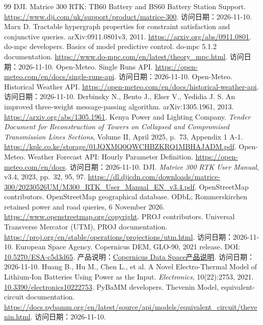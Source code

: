 \begin{thebibliography}{99}
 DJI. Matrice 300 RTK: TB60 Battery and BS60 Battery Station Support. \url{https://www.dji.com/uk/support/product/matrice-300}. 访问日期：2026-11-10.
 Marx D. Tractable hypergraph properties for constraint satisfaction and conjunctive queries. arXiv:0911.0801v3, 2011. \url{https://arxiv.org/abs/0911.0801}.
 do-mpc developers. Basics of model predictive control. do-mpc 5.1.2 documentation. \url{https://www.do-mpc.com/en/latest/theory_mpc.html}. 访问日期：2026-11-10.
 Open-Meteo. Single Runs API. \url{https://open-meteo.com/en/docs/single-runs-api}. 访问日期：2026-11-10.
 Open-Meteo. Historical Weather API. \url{https://open-meteo.com/en/docs/historical-weather-api}. 访问日期：2026-11-10.
 Derbinsky N., Bento J., Elser V., Yedidia J. S. An improved three-weight message-passing algorithm. arXiv:1305.1961, 2013. \url{https://arxiv.org/abs/1305.1961}.
 Kenya Power and Lighting Company. \emph{Tender Document for Reconstruction of Towers on Collapsed and Compromised Transmission Lines Sections}, Volume II, April 2025, p.~73, Appendix 1 A-1. \url{https://kplc.co.ke/storage/01JQXMQ0QWCHBZKRQ1MBHAJADM.pdf}.
 Open-Meteo. Weather Forecast API: Hourly Parameter Definition. \url{https://open-meteo.com/en/docs}. 访问日期：2026-11-10.
 DJI. \emph{Matrice 300 RTK User Manual}, v3.4, 2023, pp.~32, 95, 97. \url{https://dl.djicdn.com/downloads/matrice-300/20230526UM/M300_RTK_User_Manual_EN_v3.4.pdf}.
 OpenStreetMap contributors. OpenStreetMap geographical database. ODbL; Rommerskirchen retained power and road queries, 6 November 2026. \url{https://www.openstreetmap.org/copyright}.
 PROJ contributors. Universal Transverse Mercator (UTM), PROJ documentation. \url{https://proj.org/en/stable/operations/projections/utm.html}. 访问日期：2026-11-10.
 European Space Agency. Copernicus DEM, GLO-90, 2021 release. DOI: \href{https://doi.org/10.5270/ESA-c5d3d65}{10.5270/ESA-c5d3d65}. 产品说明：\href{https://dataspace.copernicus.eu/explore-data/data-collections/copernicus-contributing-missions/collections-description/COP-DEM}{Copernicus Data Space产品说明}. 访问日期：2026-11-10.
 Huang B., Hu M., Chen L., et al. A Novel Electro-Thermal Model of Lithium-Ion Batteries Using Power as the Input. \emph{Electronics}, 10(22):2753, 2021. \href{https://doi.org/10.3390/electronics10222753}{10.3390/electronics10222753}.
 PyBaMM developers. Thevenin Model, equivalent-circuit documentation. \url{https://docs.pybamm.org/en/latest/source/api/models/equivalent_circuit/thevenin.html}. 访问日期：2026-11-10.

\end{thebibliography}
